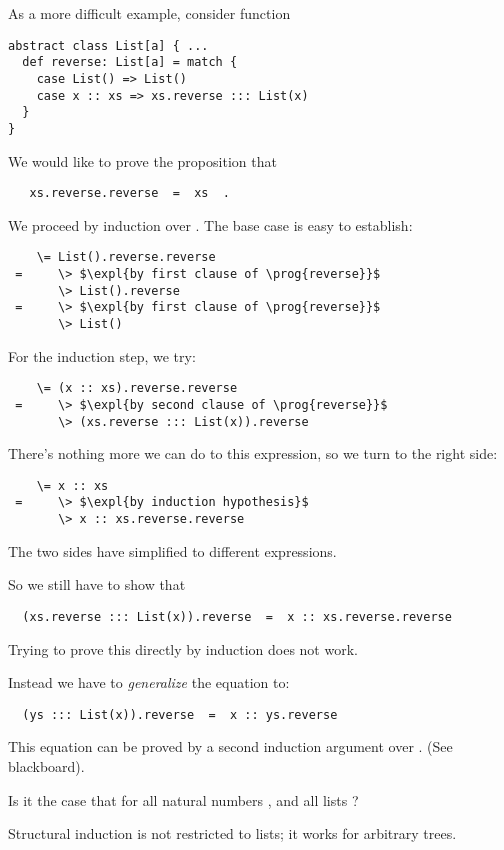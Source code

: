 {As a more difficult example, consider function
\begin{lstlisting}
abstract class List[a] { ...
  def reverse: List[a] = match {
    case List() => List()
    case x :: xs => xs.reverse ::: List(x)
  }
}
\end{lstlisting}
We would like to prove the proposition that
\begin{lstlisting}
   xs.reverse.reverse  =  xs  .
\end{lstlisting}
We proceed by induction over . The base case is easy to establish:
\begin{lstlisting}
    \= List().reverse.reverse
 =     \> $\expl{by first clause of \prog{reverse}}$
       \> List().reverse
 =     \> $\expl{by first clause of \prog{reverse}}$
       \> List()
\end{lstlisting}
\es\bs
For the induction step, we try:
\begin{lstlisting}
    \= (x :: xs).reverse.reverse
 =     \> $\expl{by second clause of \prog{reverse}}$
       \> (xs.reverse ::: List(x)).reverse
\end{lstlisting}
There's nothing more we can do to this expression, so we turn to the right side:
\begin{lstlisting}
    \= x :: xs
 =     \> $\expl{by induction hypothesis}$
       \> x :: xs.reverse.reverse
\end{lstlisting}
The two sides have simplified to different expressions.

So we still have to show that
\begin{lstlisting}
  (xs.reverse ::: List(x)).reverse  =  x :: xs.reverse.reverse
\end{lstlisting}
Trying to prove this directly by induction does not work.

Instead we have to {\em generalize} the equation to:
\begin{lstlisting}
  (ys ::: List(x)).reverse  =  x :: ys.reverse
\end{lstlisting}
\es\bs
This equation can be proved by a second induction argument over .
(See blackboard).

\begin{exercise}
Is it the case that  for all 
natural numbers ,  and all lists ?
\end{exercise}

\es
{}

Structural induction is not restricted to lists; it works for arbitrary
trees.

}
